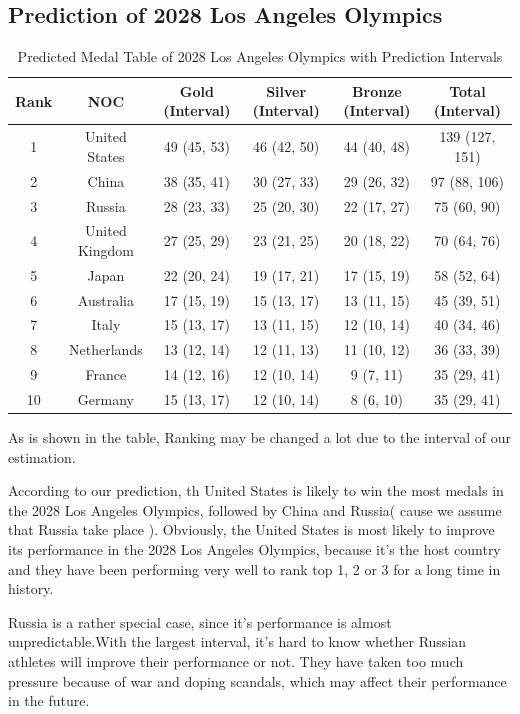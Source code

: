 \subsection{Prediction of 2028 Los Angeles Olympics}
\begin{table}[htbp]
    \centering
    \caption{Predicted Medal Table of 2028 Los Angeles Olympics with Prediction Intervals}
    \begin{tabular}{|c|c|c|c|c|c|}
        \hline
        Rank & NOC & Gold (Interval) & Silver (Interval) & Bronze (Interval) & Total (Interval) \\
        \hline
        1 & United States & 49 (45, 53) & 46 (42, 50) & 44 (40, 48) & 139 (127, 151) \\
        2 & China & 38 (35, 41) & 30 (27, 33) & 29 (26, 32) & 97 (88, 106) \\
        3 & Russia & 28 (23, 33) & 25 (20, 30) & 22 (17, 27) & 75 (60, 90) \\
        4 & United Kingdom & 27 (25, 29) & 23 (21, 25) & 20 (18, 22) & 70 (64, 76) \\
        5 & Japan & 22 (20, 24) & 19 (17, 21) & 17 (15, 19) & 58 (52, 64) \\
        6 & Australia & 17 (15, 19) & 15 (13, 17) & 13 (11, 15) & 45 (39, 51) \\
        7 & Italy & 15 (13, 17) & 13 (11, 15) & 12 (10, 14) & 40 (34, 46) \\
        8 & Netherlands & 13 (12, 14) & 12 (11, 13) & 11 (10, 12) & 36 (33, 39) \\
        9 & France & 14 (12, 16) & 12 (10, 14) & 9 (7, 11) & 35 (29, 41) \\
        10 & Germany & 15 (13, 17) & 12 (10, 14) & 8 (6, 10) & 35 (29, 41) \\
        \hline
    \end{tabular}
    \label{tab:2028}
\end{table}

As is shown in the table, Ranking may be changed a lot due to the interval of our estimation.

According to our prediction, th United States is likely to win the most medals in the 2028 Los Angeles Olympics, followed by China and Russia( cause we assume that Russia take place ). Obviously, the United States is most likely to improve its performance in the 2028 Los Angeles Olympics, because it's the host country and they have been performing very well to rank top 1, 2 or 3 for a long time in history.

Russia is a rather special case, since it's performance is almost unpredictable.With the largest interval, it's hard to know whether Russian athletes will improve their performance or not. They have taken too much pressure because of war and doping scandals, which may affect their performance in the future.

